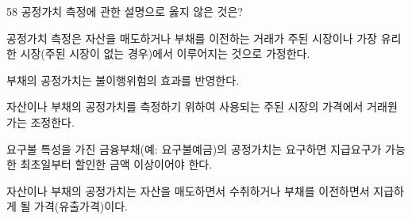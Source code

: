 \begin{question}{58}
공정가치 측정에 관한 설명으로 옳지 않은 것은?
\begin{choices}
  \item 공정가치 측정은 자산을 매도하거나 부채를 이전하는 거래가 주된 시장이나 가장 유리한 시장(주된 시장이 없는 경우)에서 이루어지는 것으로 가정한다.
  \item 부채의 공정가치는 불이행위험의 효과를 반영한다.
  \item 자산이나 부채의 공정가치를 측정하기 위하여 사용되는 주된 시장의 가격에서 거래원가는 조정한다.
  \item 요구불 특성을 가진 금융부채(예: 요구불예금)의 공정가치는 요구하면 지급요구가 가능한 최초일부터 할인한 금액 이상이어야 한다.
  \item 자산이나 부채의 공정가치는 자산을 매도하면서 수취하거나 부채를 이전하면서 지급하게 될 가격(유출가격)이다.
\end{choices}
\end{question}
